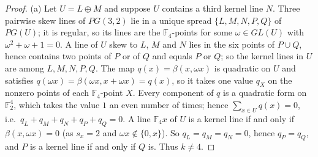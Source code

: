 \documentclass[11pt]{article}
\theoremstyle{definition}
\newcommand{\F}{\mathbb{F}}
\begin{document}
\begin{proof}
(a) Let $U=L\oplus M$ and suppose $U$ contains a third kernel line $N$. Three pairwise skew lines of
$PG(3,2)$ lie in a unique spread $\{L,M,N,P,Q\}$ of $PG(U)$; it is regular, so its lines are the
$\F_4$-points for some $\omega\in GL(U)$ with $\omega^2+\omega+1=0$. A line of $U$ skew to $L$, $M$
and $N$ lies in the six points of $P\cup Q$, hence contains two points of $P$ or of $Q$ and equals
$P$ or $Q$; so the kernel lines in $U$ are among $L,M,N,P,Q$. The map $q(x)=\beta(x,\omega x)$ is
quadratic on $U$ and satisfies $q(\omega x)=\beta(\omega x,x+\omega x)=q(x)$, so it takes one value
$q_X$ on the nonzero points of each $\F_4$-point $X$. Every component of $q$ is a quadratic form on
$\F_2^4$, which takes the value $1$ an even number of times; hence $\sum_{x\in U}q(x)=0$, i.e.\
$q_L+q_M+q_N+q_P+q_Q=0$. A line $\F_4x$ of $U$ is a kernel line if and only if $\beta(x,\omega x)=0$
(as $s_x=2$ and $\omega x\notin\{0,x\}$). So $q_L=q_M=q_N=0$, hence $q_P=q_Q$, and $P$ is a kernel
line if and only if $Q$ is. Thus $k\neq4$.


\end{proof}
\end{document}
